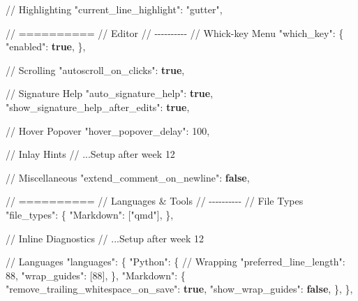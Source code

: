 \documentclass[
  letterpaper,
  DIV=11,
  numbers=noendperiod]{scrreprt}
\newenvironment{Shaded}{\begin{snugshade}}{\end{snugshade}}
\newcommand{\DataTypeTok}[1]{\textcolor[rgb]{0.68,0.00,0.00}{#1}}
\newcommand{\DecValTok}[1]{\textcolor[rgb]{0.68,0.00,0.00}{#1}}
\newcommand{\ErrorTok}[1]{\textcolor[rgb]{0.68,0.00,0.00}{#1}}
\newcommand{\FunctionTok}[1]{\textcolor[rgb]{0.28,0.35,0.67}{#1}}
\newcommand{\KeywordTok}[1]{\textcolor[rgb]{0.00,0.23,0.31}{\textbf{#1}}}
\newcommand{\OtherTok}[1]{\textcolor[rgb]{0.00,0.23,0.31}{#1}}
\newcommand{\StringTok}[1]{\textcolor[rgb]{0.13,0.47,0.30}{#1}}
\begin{document}
\begin{codelisting}
\begin{Shaded}
\begin{Highlighting}[]
  \ErrorTok{//} \ErrorTok{Highlighting}
  \DataTypeTok{"current\_line\_highlight"}\FunctionTok{:} \StringTok{"gutter"}\FunctionTok{,}

  \ErrorTok{//} \ErrorTok{==========}
  \ErrorTok{//} \ErrorTok{Editor}
  \ErrorTok{//} \ErrorTok{{-}{-}{-}{-}{-}{-}{-}{-}{-}{-}}
  \ErrorTok{//} \ErrorTok{Whick{-}key} \ErrorTok{Menu}
  \DataTypeTok{"which\_key"}\FunctionTok{:} \FunctionTok{\{}
    \DataTypeTok{"enabled"}\FunctionTok{:} \KeywordTok{true}\FunctionTok{,}
  \FunctionTok{\},}

  \ErrorTok{//} \ErrorTok{Scrolling}
  \DataTypeTok{"autoscroll\_on\_clicks"}\FunctionTok{:} \KeywordTok{true}\FunctionTok{,}

  \ErrorTok{//} \ErrorTok{Signature} \ErrorTok{Help}
  \DataTypeTok{"auto\_signature\_help"}\FunctionTok{:} \KeywordTok{true}\FunctionTok{,}
  \DataTypeTok{"show\_signature\_help\_after\_edits"}\FunctionTok{:} \KeywordTok{true}\FunctionTok{,}

  \ErrorTok{//} \ErrorTok{Hover} \ErrorTok{Popover}
  \DataTypeTok{"hover\_popover\_delay"}\FunctionTok{:} \DecValTok{100}\FunctionTok{,}

  \ErrorTok{//} \ErrorTok{Inlay} \ErrorTok{Hints}
  \ErrorTok{//} \ErrorTok{...Setup} \ErrorTok{after} \ErrorTok{week} \ErrorTok{12}

  \ErrorTok{//} \ErrorTok{Miscellaneous}
  \DataTypeTok{"extend\_comment\_on\_newline"}\FunctionTok{:} \KeywordTok{false}\FunctionTok{,}

  \ErrorTok{//} \ErrorTok{==========}
  \ErrorTok{//} \ErrorTok{Languages} \ErrorTok{\&} \ErrorTok{Tools}
  \ErrorTok{//} \ErrorTok{{-}{-}{-}{-}{-}{-}{-}{-}{-}{-}}
  \ErrorTok{//} \ErrorTok{File} \ErrorTok{Types}
  \DataTypeTok{"file\_types"}\FunctionTok{:} \FunctionTok{\{}
    \DataTypeTok{"Markdown"}\FunctionTok{:} \OtherTok{[}\StringTok{"qmd"}\OtherTok{]}\FunctionTok{,}
  \FunctionTok{\},}

  \ErrorTok{//} \ErrorTok{Inline} \ErrorTok{Diagnostics}
  \ErrorTok{//} \ErrorTok{...Setup} \ErrorTok{after} \ErrorTok{week} \ErrorTok{12}

  \ErrorTok{//} \ErrorTok{Languages}
  \DataTypeTok{"languages"}\FunctionTok{:} \FunctionTok{\{}
    \DataTypeTok{"Python"}\FunctionTok{:} \FunctionTok{\{}
      \ErrorTok{//} \ErrorTok{Wrapping}
      \DataTypeTok{"preferred\_line\_length"}\FunctionTok{:} \DecValTok{88}\FunctionTok{,}
      \DataTypeTok{"wrap\_guides"}\FunctionTok{:} \OtherTok{[}\DecValTok{88}\OtherTok{]}\FunctionTok{,}
    \FunctionTok{\},}
    \DataTypeTok{"Markdown"}\FunctionTok{:} \FunctionTok{\{}
      \DataTypeTok{"remove\_trailing\_whitespace\_on\_save"}\FunctionTok{:} \KeywordTok{true}\FunctionTok{,}
      \DataTypeTok{"show\_wrap\_guides"}\FunctionTok{:} \KeywordTok{false}\FunctionTok{,}
    \FunctionTok{\},}
  \FunctionTok{\},}


\end{Highlighting}
\end{Shaded}
\end{codelisting}
\end{document}
